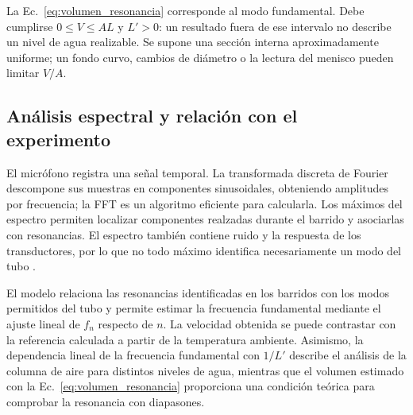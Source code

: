 La Ec.~\eqref{eq:volumen_resonancia} corresponde al modo fundamental. Debe cumplirse $0\leq V\leq AL$ y $L'>0$: un resultado fuera de ese intervalo no describe un nivel de agua realizable. Se supone una sección interna aproximadamente uniforme; un fondo curvo, cambios de diámetro o la lectura del menisco pueden limitar $V/A$.

\subsection{Análisis espectral y relación con el experimento}
El micrófono registra una señal temporal. La transformada discreta de Fourier descompone sus muestras en componentes sinusoidales, obteniendo amplitudes por frecuencia; la FFT es un algoritmo eficiente para calcularla. Los máximos del espectro permiten localizar componentes realzadas durante el barrido y asociarlas con resonancias. El espectro también contiene ruido y la respuesta de los transductores, por lo que no todo máximo identifica necesariamente un modo del tubo \cite{smithdft}.



El modelo relaciona las resonancias identificadas en los barridos con los modos permitidos del tubo y permite estimar la frecuencia fundamental mediante el ajuste lineal de $f_n$ respecto de $n$. La velocidad obtenida se puede contrastar con la referencia calculada a partir de la temperatura ambiente. Asimismo, la dependencia lineal de la frecuencia fundamental con $1/L'$ describe el análisis de la columna de aire para distintos niveles de agua, mientras que el volumen estimado con la Ec.~\eqref{eq:volumen_resonancia} proporciona una condición teórica para comprobar la resonancia con diapasones.
